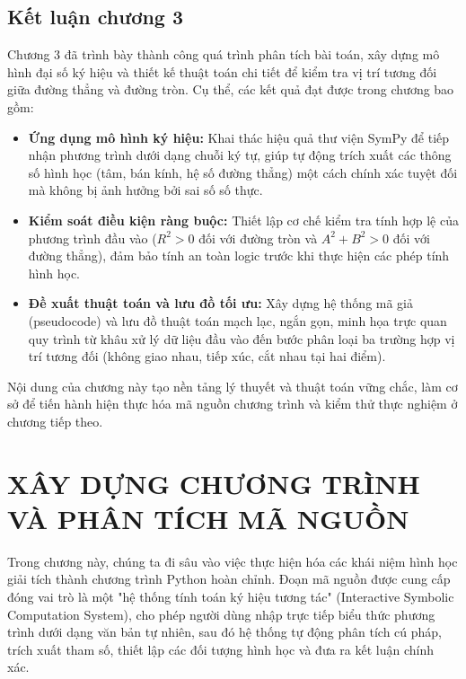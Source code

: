 \documentclass[12pt,a4paper]{article}
\begin{document}
\subsection{ Kết luận chương 3}

Chương 3 đã trình bày thành công quá trình phân tích bài toán, xây dựng mô hình đại số ký hiệu và thiết kế thuật toán chi tiết để kiểm tra vị trí tương đối giữa đường thẳng và đường tròn. Cụ thể, các kết quả đạt được trong chương bao gồm:
\begin{itemize}[leftmargin=*]
    \item \textbf{Ứng dụng mô hình ký hiệu:} Khai thác hiệu quả thư viện SymPy để tiếp nhận phương trình dưới dạng chuỗi ký tự, giúp tự động trích xuất các thông số hình học (tâm, bán kính, hệ số đường thẳng) một cách chính xác tuyệt đối mà không bị ảnh hưởng bởi sai số số thực.
    \item \textbf{Kiểm soát điều kiện ràng buộc:} Thiết lập cơ chế kiểm tra tính hợp lệ của phương trình đầu vào ($R^2 > 0$ đối với đường tròn và $A^2 + B^2 > 0$ đối với đường thẳng), đảm bảo tính an toàn logic trước khi thực hiện các phép tính hình học.
    \item \textbf{Đề xuất thuật toán và lưu đồ tối ưu:} Xây dựng hệ thống mã giả (pseudocode) và lưu đồ thuật toán mạch lạc, ngắn gọn, minh họa trực quan quy trình từ khâu xử lý dữ liệu đầu vào đến bước phân loại ba trường hợp vị trí tương đối (không giao nhau, tiếp xúc, cắt nhau tại hai điểm).
\end{itemize}
Nội dung của chương này tạo nền tảng lý thuyết và thuật toán vững chắc, làm cơ sở để tiến hành hiện thực hóa mã nguồn chương trình và kiểm thử thực nghiệm ở chương tiếp theo.

\newpage
\section{ XÂY DỰNG CHƯƠNG TRÌNH VÀ PHÂN TÍCH MÃ NGUỒN}

Trong chương này, chúng ta đi sâu vào việc thực hiện hóa các khái niệm hình học giải tích thành chương trình Python hoàn chỉnh. Đoạn mã nguồn được cung cấp đóng vai trò là một "hệ thống tính toán ký hiệu tương tác" (Interactive Symbolic Computation System), cho phép người dùng nhập trực tiếp biểu thức phương trình dưới dạng văn bản tự nhiên, sau đó hệ thống tự động phân tích cú pháp, trích xuất tham số, thiết lập các đối tượng hình học và đưa ra kết luận chính xác.
\end{document}
